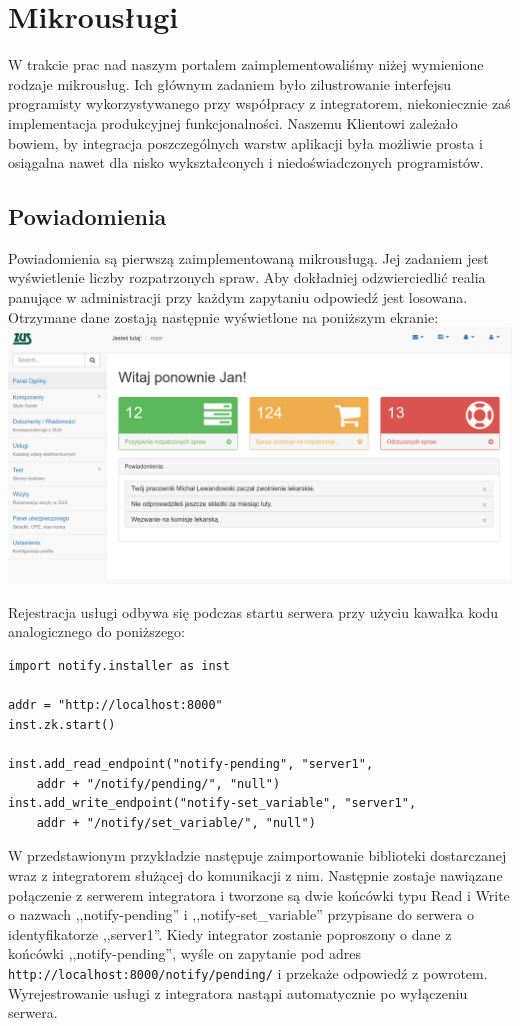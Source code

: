 \documentclass[licencjacka]{pracamgr}
\begin{document}
\section{Mikrousługi}

W trakcie prac nad naszym portalem zaimplementowaliśmy niżej wymienione rodzaje
mikrousług. Ich głównym zadaniem było zilustrowanie interfejsu programisty
wykorzystywanego przy współpracy z integratorem, niekoniecznie zaś implementacja
produkcyjnej funkcjonalności. Naszemu Klientowi zależało bowiem, by integracja
poszczególnych warstw aplikacji była możliwie prosta i osiągalna nawet dla nisko
wykształconych i niedoświadczonych programistów.

\subsection{Powiadomienia}

Powiadomienia są pierwszą zaimplementowaną mikrousługą. Jej zadaniem jest wyświetlenie
liczby rozpatrzonych spraw. Aby dokładniej odzwierciedlić realia panujące w
administracji przy każdym zapytaniu odpowiedź jest losowana. Otrzymane dane
zostają następnie wyświetlone na poniższym ekranie:\\
\includegraphics[width=\textwidth]{obrazki/powiadomienia2.png}

Rejestracja usługi odbywa się podczas startu serwera przy użyciu kawałka kodu
analogicznego do poniższego:

\begin{verbatim}
import notify.installer as inst

addr = "http://localhost:8000"
inst.zk.start()

inst.add_read_endpoint("notify-pending", "server1", 
	addr + "/notify/pending/", "null")
inst.add_write_endpoint("notify-set_variable", "server1",
	addr + "/notify/set_variable/", "null")
\end{verbatim}
W przedstawionym przykładzie następuje zaimportowanie biblioteki dostarczanej wraz z
integratorem służącej do komunikacji z nim. Następnie zostaje nawiązane połączenie z
serwerem integratora i tworzone są dwie końcówki typu Read i Write o nazwach
,,notify-pending'' i ,,notify-set\_variable'' przypisane do serwera o identyfikatorze
,,server1''. Kiedy integrator zostanie poproszony o dane z końcówki ,,notify-pending'',
wyśle on zapytanie pod adres \texttt{http://localhost:8000/notify/pending/} i przekaże
odpowiedź z powrotem. Wyrejestrowanie usługi z integratora nastąpi automatycznie po
wyłączeniu serwera.
\end{document}

